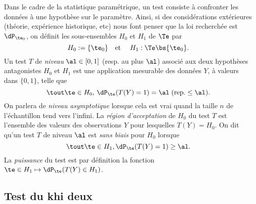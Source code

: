 Dans le cadre de la statistique paramétrique, un test consiste à confronter
les données à une hypothèse sur le paramètre. Ainsi, si des considérations
extérieures (théorie, expérience historique, etc) nous font penser que la loi
recherchée est $\dP_{\te_0}$, on définit les sous-ensembles $H_0$ et $H_1$ de
$\Te$ par
$$
H_0:=\{\te_0\}
\text{\quad et \quad}
H_1: \Te\bs\{\te_0\}.
$$
Un test $T$ de \emph{niveau} $\al\in[0,1]$ (resp. au plus $\al$) associé aux
deux hypothèses antagonistes $H_0$ et $H_1$ est une application mesurable des
données $Y$, à valeurs dans $\{0,1\}$, telle que
$$
\tout\te\in H_0,\,\dP_\te(T(Y)=1) = \al\; (\text{rep.} \leq \al).
$$
On parlera de \emph{niveau asymptotique} lorsque cela est vrai quand la
taille $n$ de l'échantillon tend vers l'infini. La \emph{région d'acceptation}
de $H_0$ du test $T$ est l'ensemble des valeurs des observations $Y$ pour
lesquelles $T(Y)=H_0$. On dit qu'un test $T$ de niveau $\al$ est \emph{sans
  biais} pour $H_0$ lorsque
$$
\tout\te\in H_1, \dP_\te(T(Y)=1) \geq \al.
$$
La \emph{puissance} du test est par définition la fonction $\te\in H_1
\mapsto \dP_\te(T(Y)\in H_1)$.


%
\subsection{Test du khi deux}
\label{ss:test-chideux}
%

